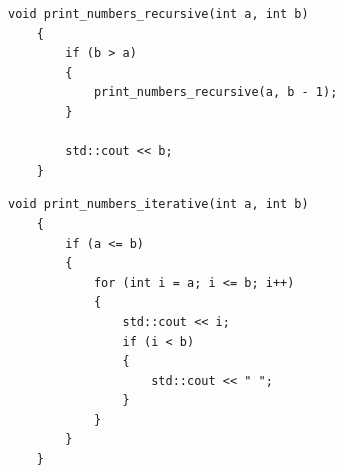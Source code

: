 \setcounter{lstlisting}{0} 
\renewcommand{\thelstlisting}{A.\arabic{lstlisting}} 

\begin{lstlisting}[label={lst:recursive}, caption={Рекурсивная функция вывода чисел в диапазоне от А до В}]
	void print_numbers_recursive(int a, int b)
	{
		if (b > a)
		{
			print_numbers_recursive(a, b - 1);
		}
		
		std::cout << b;
	}
\end{lstlisting}

\begin{lstlisting}[label={lst:iterative}, caption={Итеративная функция вывода чисел в диапазоне от А до В}]
	void print_numbers_iterative(int a, int b)
	{
		if (a <= b)
		{
			for (int i = a; i <= b; i++)
			{
				std::cout << i;
				if (i < b)
				{
					std::cout << " ";
				}
			}
		}
	}
\end{lstlisting}